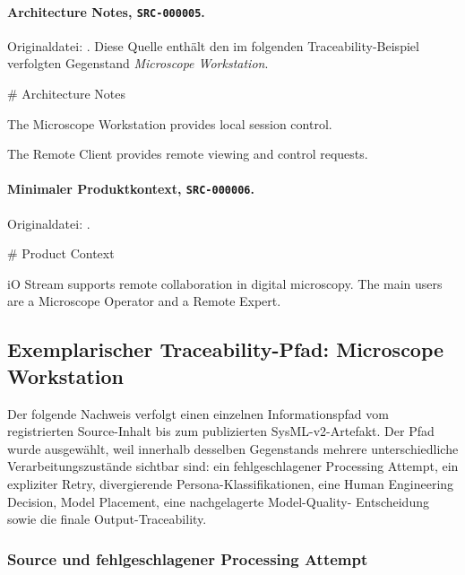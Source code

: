 \paragraph{Architecture Notes, \texttt{SRC-000005}.}
Originaldatei: .
Diese Quelle enthält den im folgenden Traceability-Beispiel verfolgten
Gegenstand \emph{Microscope Workstation}.

\begin{evidencebox}
# Architecture Notes

The Microscope Workstation provides local session control.

The Remote Client provides remote viewing and control requests.
\end{evidencebox}

\paragraph{Minimaler Produktkontext, \texttt{SRC-000006}.}
Originaldatei:
.

\begin{evidencebox}
# Product Context

iO Stream supports remote collaboration in digital microscopy.
The main users are a Microscope Operator and a Remote Expert.
\end{evidencebox}

\subsection{Exemplarischer Traceability-Pfad: Microscope Workstation}
\label{app:traceability_930444_workstation}

Der folgende Nachweis verfolgt einen einzelnen Informationspfad vom
registrierten Source-Inhalt bis zum publizierten SysML-v2-Artefakt. Der Pfad
wurde ausgewählt, weil innerhalb desselben Gegenstands mehrere unterschiedliche
Verarbeitungszustände sichtbar sind: ein fehlgeschlagener Processing Attempt,
ein expliziter Retry, divergierende Persona-Klassifikationen, eine Human
Engineering Decision, Model Placement, eine nachgelagerte Model-Quality-
Entscheidung sowie die finale Output-Traceability.

\subsubsection{Source und fehlgeschlagener Processing Attempt}

